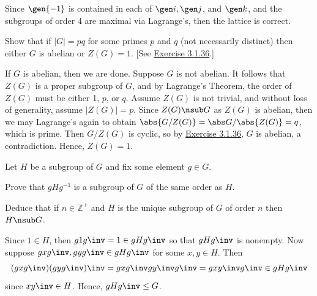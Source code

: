 \begin{problems}
\begin{sol}
        Since $\gen{-1}$ is contained in each of $\gen i, \gen j$, and $\gen k$, and the subgroups of order 4 are maximal via Lagrange's, then the lattice is correct.
    \end{sol}
    \item Show that if $|G| = pq$ for some primes $p$ and $q$ (not necessarily distinct) then either $G$ is abelian or $Z(G) = 1$. [See \hyperref[ex3.1.36]{Exercise 3.1.36}.]
    \begin{sol}
        If $G$ is abelian, then we are done. Suppose $G$ is not abelian. It follows that $Z(G)$ is a proper subgroup of $G$, and by Lagrange's Theorem, the order of $Z(G)$ must be either 1, $p$, or $q$. Assume $Z(G)$ is not trivial, and without loss of generality, assume $|Z(G)| = p$. Since $Z(G) \nsub G$ as $Z(G)$ is abelian, then we may Lagrange's again to obtain $\abs{G/Z(G)} = \abs G/\abs{Z(G)} = q$, which is prime. Then $G/Z(G)$ is cyclic, so by \hyperref[ex3.1.36]{Exercise 3.1.36}, $G$ is abelian, a contradiction. Hence, $Z(G) = 1$.
    \end{sol}
    \item Let $H$ be a subgroup of $G$ and fix some element $g \in G$. 
    \begin{problems}
        \item Prove that $gH g^{-1}$ is a subgroup of $G$ of the same order as $H$.
        \item Deduce that if $n \in \mathbb{Z}^+$ and $H$ is the unique subgroup of $G$ of order $n$ then $H \nsub G$.
    \end{problems}
    \begin{solalph}
        \item Since $1 \in H$, then $g1g\inv = 1 \in gHg\inv$ so that $gHg\inv$ is nonempty. Now suppose $gxg\inv, gyg\inv \in gHg\inv$ for some $x, y \in H$. Then
        \[(gxg\inv)(gyg\inv)\inv = gxg\inv gy\inv g\inv = gxy\inv g\inv \in gHg\inv\]
        since $xy\inv \in H$. Hence, $gHg\inv \leq G$.


\end{solalph}
\end{problems}
